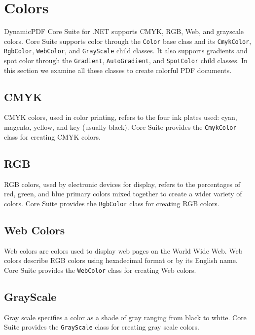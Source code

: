 \documentclass[american]{tufte-book}
\numberwithin{equation}{section}
\numberwithin{figure}{section}
\begin{document}
{\section{Colors}\label{sec:Colors}

DynamicPDF Core Suite for .NET supports CMYK, RGB, Web, and grayscale
colors. Core Suite supports color through the \texttt{Color} base
class and its \texttt{CmykColor}, \texttt{RgbColor}, \texttt{WebColor},
and \texttt{GrayScale} child classes. It also supports gradients and
spot color through the \texttt{Gradient}, \texttt{AutoGradient}, and
\texttt{SpotColor} child classes. In this section we examine all these
classes to create colorful PDF documents.

\subsection{CMYK}

CMYK colors, used in color printing, refers to the four ink plates
used: cyan, magenta, yellow, and key (usually black). Core Suite provides
the \texttt{CmykColor} class for creating CMYK colors.

\subsection{RGB}

RGB colors, used by electronic devices for display, refers to the
percentages of red, green, and blue primary colors mixed together
to create a wider variety of colors. Core Suite provides the \texttt{RgbColor}
class for creating RGB colors.

\subsection{Web Colors}

Web colors are colors used to display web pages on the World Wide
Web. Web colors describe RGB colors using hexadecimal format or by
its English name. Core Suite provides the \texttt{WebColor} class
for creating Web colors.

\subsection{GrayScale}

Gray scale specifies a color as a shade of gray ranging from black
to white. Core Suite provides the \texttt{GrayScale} class for creating
gray scale colors.

}
\end{document}
